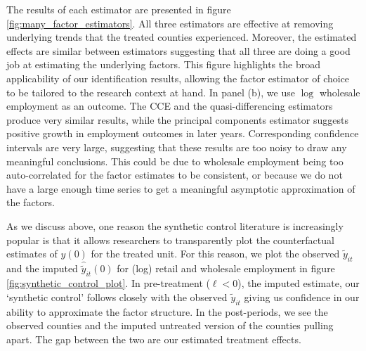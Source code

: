 \documentclass[12pt]{article}
\begin{document}
The results of each estimator are presented in figure \ref{fig:many_factor_estimators}. All three estimators are effective at removing underlying trends that the treated counties experienced. Moreover, the estimated effects are similar between estimators suggesting that all three are doing a good job at estimating the underlying factors. This figure highlights the broad applicability of our identification results, allowing the factor estimator of choice to be tailored to the research context at hand. In panel (b), we use $\log$ wholesale employment as an outcome. The CCE and the quasi-differencing estimators produce very similar results, while the principal components estimator suggests positive growth in employment outcomes in later years. Corresponding confidence intervals are very large, suggesting that these results are too noisy to draw any meaningful conclusions. This could be due to wholesale employment being too auto-correlated for the factor estimates to be consistent, or because we do not have a large enough time series to get a meaningful asymptotic approximation of the factors.

As we discuss above, one reason the synthetic control literature is increasingly popular is that it allows researchers to transparently plot the counterfactual estimates of $y(0)$ for the treated unit. For this reason, we plot the observed $\tilde{y}_{it}$ and the imputed $\hat{\tilde{y}}_{it}(0)$ for (log) retail and wholesale employment in figure \ref{fig:synthetic_control_plot}. In pre-treatment ($\ell < 0$), the imputed estimate, our `synthetic control' follows closely with the observed $\tilde{y}_{it}$ giving us confidence in our ability to approximate the factor structure. In the post-periods, we see the observed counties and the imputed untreated version of the counties pulling apart. The gap between the two are our estimated treatment effects. 
\end{document}
